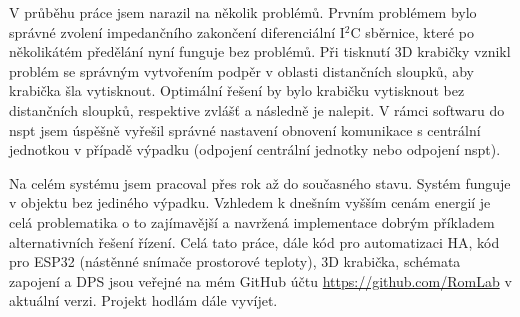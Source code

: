 V průběhu práce jsem narazil na několik problémů. Prvním problémem bylo správné zvolení impedančního zakončení diferenciální I$^{2}$C sběrnice, které po několikátém předělání nyní funguje bez problémů. Při tisknutí 3D krabičky vznikl problém se správným vytvořením podpěr v oblasti distančních sloupků, aby krabička šla vytisknout. Optimální řešení by bylo krabičku vytisknout bez distančních sloupků, respektive zvlášť a následně je nalepit. V rámci softwaru do \acrshort{nspt} jsem úspěšně vyřešil správné nastavení obnovení komunikace s centrální jednotkou v případě výpadku (odpojení centrální jednotky nebo odpojení \acrshort{nspt}).

Na celém systému jsem pracoval přes rok až do současného stavu. Systém funguje v objektu bez jediného výpadku. Vzhledem k dnešním vyšším cenám energií je celá problematika o to zajímavější a navržená implementace dobrým příkladem alternativních řešení řízení. Celá tato práce, dále kód pro automatizaci HA, kód pro ESP32 (nástěnné snímače prostorové teploty), 3D krabička, schémata zapojení a DPS jsou veřejné na mém GitHub účtu \mbox{\url{https://github.com/RomLab}} v aktuální verzi. Projekt hodlám dále vyvíjet.

